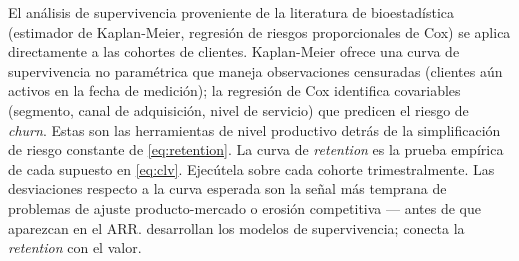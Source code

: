 El análisis de supervivencia proveniente de la literatura de bioestadística (estimador de Kaplan-Meier, regresión de riesgos proporcionales de Cox) se aplica directamente a las cohortes de clientes. Kaplan-Meier ofrece una curva de supervivencia no paramétrica que maneja observaciones censuradas (clientes aún activos en la fecha de medición); la regresión de Cox identifica covariables (segmento, canal de adquisición, nivel de servicio) que predicen el riesgo de \emph{churn}. Estas son las herramientas de nivel productivo detrás de la simplificación de riesgo constante de \cref{eq:retention}. La curva de \emph{retention} es la prueba empírica de cada supuesto en \cref{eq:clv}. Ejecútela sobre cada cohorte trimestralmente. Las desviaciones respecto a la curva esperada son la señal más temprana de problemas de ajuste producto-mercado o erosión competitiva --- antes de que aparezcan en el ARR. \textcite{fader2005rfm} desarrollan los modelos de supervivencia; \textcite{gupta2004customer} conecta la \emph{retention} con el valor.

